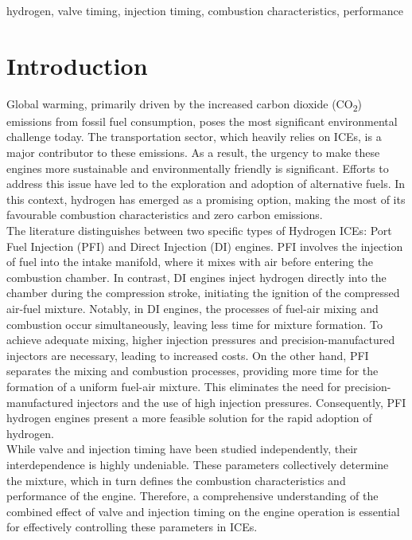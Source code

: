 \documentclass[conference]{IEEEtran}
\begin{document}
\begin{IEEEkeywords}
hydrogen, valve timing, injection timing, combustion characteristics, performance
\end{IEEEkeywords}

\section{Introduction}

Global warming, primarily driven by the increased carbon dioxide (CO\textsubscript{2}) emissions from fossil fuel consumption, poses the most significant environmental challenge today. 
The transportation sector, which heavily relies on ICEs, is a major contributor to these emissions. 
As a result, the urgency to make these engines more sustainable and environmentally friendly is significant. 
Efforts to address this issue have led to the exploration and adoption of alternative fuels. 
In this context, hydrogen has emerged as a promising option, making the most of its favourable combustion characteristics and zero carbon emissions.\\

The literature distinguishes between two specific types of Hydrogen ICEs: Port Fuel Injection (PFI) and Direct Injection (DI) engines. 
PFI involves the injection of fuel into the intake manifold, where it mixes with air before entering the combustion chamber. 
In contrast, DI engines inject hydrogen directly into the chamber during the compression stroke, initiating the ignition of the compressed air-fuel mixture. 
Notably, in DI engines, the processes of fuel-air mixing and combustion occur simultaneously, leaving less time for mixture formation. 
To achieve adequate mixing, higher injection pressures and precision-manufactured injectors are necessary, leading to increased costs. 
On the other hand, PFI separates the mixing and combustion processes, providing more time for the formation of a uniform fuel-air mixture. 
This eliminates the need for precision-manufactured injectors and the use of high injection pressures. 
Consequently, PFI hydrogen engines present a more feasible solution for the rapid adoption of hydrogen.\\

While valve and injection timing have been studied independently, their interdependence is highly undeniable. 
These parameters collectively determine the mixture, which in turn defines the combustion characteristics and performance of the engine. 
Therefore, a comprehensive understanding of the combined effect of valve and injection timing on the engine operation is essential for effectively controlling these parameters in ICEs.
\end{document}
